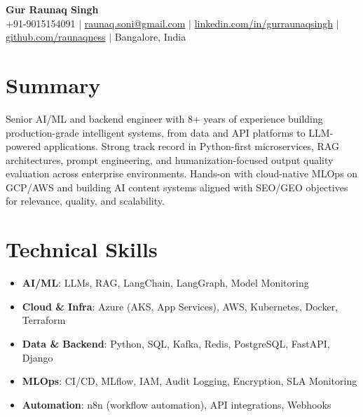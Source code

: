\documentclass[letterpaper,10pt]{article}
\newcommand{\resumeItem}[1]{\item\small{#1}}
\newcommand{\resumeSubHeadingList}{\begin{itemize}[leftmargin=0.15in, label={}]}
\newcommand{\resumeSubHeadingListEnd}{\end{itemize}}
\begin{document}
\begin{center}
  \textbf{\Huge Gur Raunaq Singh} \\
  \small +91-9015154091 $|$ \href{mailto:raunaq.soni@gmail.com}{raunaq.soni@gmail.com} $|$
  \href{https://www.linkedin.com/in/gurraunaqsingh/}{linkedin.com/in/gurraunaqsingh} $|$
  \href{https://github.com/raunaqness}{github.com/raunaqness} $|$ Bangalore, India
\end{center}

\section*{Summary}
Senior AI/ML and backend engineer with 8+ years of experience building production-grade intelligent systems, from data and API platforms to LLM-powered applications. Strong track record in Python-first microservices, RAG architectures, prompt engineering, and humanization-focused output quality evaluation across enterprise environments. Hands-on with cloud-native MLOps on GCP/AWS and building AI content systems aligned with SEO/GEO objectives for relevance, quality, and scalability.

\section{Technical Skills}
\resumeSubHeadingList
  \resumeItem{\textbf{AI/ML}: LLMs, RAG, LangChain, LangGraph, Model Monitoring}
  \resumeItem{\textbf{Cloud \& Infra}: Azure (AKS, App Services), AWS, Kubernetes, Docker, Terraform}
  \resumeItem{\textbf{Data \& Backend}: Python, SQL, Kafka, Redis, PostgreSQL, FastAPI, Django}
  \resumeItem{\textbf{MLOps}: CI/CD, MLflow, IAM, Audit Logging, Encryption, SLA Monitoring}
  \resumeItem{\textbf{Automation}: n8n (workflow automation), API integrations, Webhooks}
\resumeSubHeadingListEnd
\end{document}

